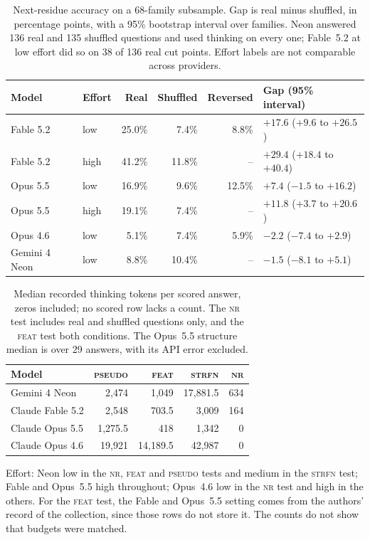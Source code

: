 \documentclass[11pt]{article}
\newcommand{\tnr}{\textmd{\textsc{nr}}}\newcommand{\tfeat}{\textmd{\textsc{feat}}}
\newcommand{\tpseudo}{\textmd{\textsc{pseudo}}}\newcommand{\tstrfn}{\textmd{\textsc{strfn}}}
\begin{document}
\begin{table}[ht]
\centering\small
\caption{Next-residue accuracy on a 68-family subsample. Gap is real minus shuffled, in percentage points,
with a 95\% bootstrap interval over families. Neon answered 136 real and 135 shuffled questions and used
thinking on every one; Fable~5.2 at low effort did so on 38 of 136 real cut points. Effort labels are not
comparable across providers.}
\label{tab:next}
\begin{tabular}{llrrrl}
\toprule
Model & Effort & Real & Shuffled & Reversed & Gap (95\% interval) \\
\midrule
Fable 5.2 & low & 25.0\% & 7.4\% & 8.8\% & $+17.6$ ($+9.6$ to $+26.5$) \\
Fable 5.2 & high & 41.2\% & 11.8\% & -- & $+29.4$ ($+18.4$ to $+40.4$) \\
Opus 5.5 & low & 16.9\% & 9.6\% & 12.5\% & $+7.4$ ($-1.5$ to $+16.2$) \\
Opus 5.5 & high & 19.1\% & 7.4\% & -- & $+11.8$ ($+3.7$ to $+20.6$) \\
Opus 4.6 & low & 5.1\% & 7.4\% & 5.9\% & $-2.2$ ($-7.4$ to $+2.9$) \\
Gemini 4 Neon & low & 8.8\% & 10.4\% & -- & $-1.5$ ($-8.1$ to $+5.1$) \\
\bottomrule
\end{tabular}
\end{table}

\begin{table}[ht]
\centering\small
\caption{Median recorded thinking tokens per scored answer, zeros included; no scored row lacks a count.
The \tnr{} test includes real and shuffled questions only, and the \tfeat{} test both conditions. The Opus~5.5 structure
median is over 29 answers, with its API error excluded.}
\label{tab:thinking}
\begin{tabular}{lrrrr}
\toprule
Model & \tpseudo & \tfeat & \tstrfn & \tnr \\
\midrule
Gemini 4 Neon & 2,474 & 1,049 & 17,881.5 & 634 \\
Claude Fable 5.2 & 2,548 & 703.5 & 3,009 & 164 \\
Claude Opus 5.5 & 1,275.5 & 418 & 1,342 & 0 \\
Claude Opus 4.6 & 19,921 & 14,189.5 & 42,987 & 0 \\
\bottomrule
\end{tabular}

\smallskip
\parbox{\linewidth}{\footnotesize Effort: Neon low in the \tnr, \tfeat{} and \tpseudo{} tests and medium in the \tstrfn{} test; Fable and
Opus~5.5 high throughout; Opus~4.6 low in the \tnr{} test and high in the others. For the \tfeat{} test, the Fable and
Opus~5.5 setting comes from the authors' record of the collection, since those rows do not store it.
The counts do not show that budgets were matched.}
\end{table}
\end{document}
